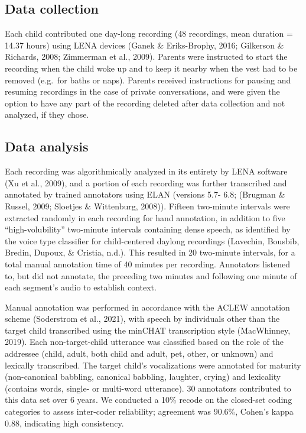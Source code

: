 \documentclass[
  man,floatsintext]{apa6}
\begin{document}
\subsection{Data collection}\label{data-collection}

Each child contributed one day-long recording (48 recordings, mean duration = 14.37 hours) using LENA devices (Ganek \& Eriks-Brophy, 2016; Gilkerson \& Richards, 2008; Zimmerman et al., 2009). Parents were instructed to start the recording when the child woke up and to keep it nearby when the vest had to be removed (e.g.~for baths or naps). Parents received instructions for pausing and resuming recordings in the case of private conversations, and were given the option to have any part of the recording deleted after data collection and not analyzed, if they chose.

\subsection{Data analysis}\label{data-analysis}

Each recording was algorithmically analyzed in its entirety by LENA software (Xu et al., 2009), and a portion of each recording was further transcribed and annotated by trained annotators using ELAN (versions 5.7- 6.8; (Brugman \& Russel, 2009; Sloetjes \& Wittenburg, 2008)). Fifteen two-minute intervals were extracted randomly in each recording for hand annotation, in addition to five ``high-volubility'' two-minute intervals containing dense speech, as identified by the voice type classifier for child-centered daylong recordings (Lavechin, Bousbib, Bredin, Dupoux, \& Cristia, n.d.). This resulted in 20 two-minute intervals, for a total manual annotation time of 40 minutes per recording. Annotators listened to, but did not annotate, the preceding two minutes and following one minute of each segment's audio to establish context.

Manual annotation was performed in accordance with the ACLEW annotation scheme (Soderstrom et al., 2021), with speech by individuals other than the target child transcribed using the minCHAT transcription style (MacWhinney, 2019). Each non-target-child utterance was classified based on the role of the addressee (child, adult, both child and adult, pet, other, or unknown) and lexically transcribed. The target child's vocalizations were annotated for maturity (non-canonical babbling, canonical babbling, laughter, crying) and lexicality (contains words, single- or multi-word utterance). 30 annotators contributed to this data set over 6 years. We conducted a 10\% recode on the closed-set coding categories to assess inter-coder reliability; agreement was 90.6\%, Cohen's kappa 0.88, indicating high consistency.
\end{document}
